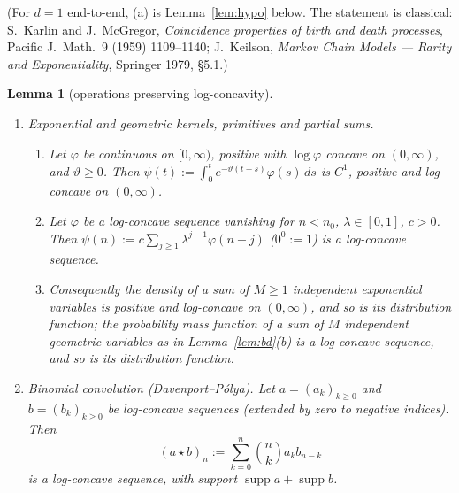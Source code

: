 \documentclass[11pt,a4paper]{article}
\newtheorem{lemma}[theorem]{Lemma}
\theoremstyle{definition}
\begin{document}
(For $d=1$ end-to-end, (a) is Lemma~\ref{lem:hypo} below. The statement is classical: S.~Karlin and J.~McGregor, \emph{Coincidence properties of birth and death processes}, Pacific J.\ Math.\ 9 (1959) 1109--1140; J.~Keilson, \emph{Markov Chain Models --- Rarity and Exponentiality}, Springer 1979, \S5.1.)

\begin{lemma}[operations preserving log-concavity]\label{lem:lcops}
\begin{enumerate}
\item[(a)] \emph{Exponential and geometric kernels, primitives and partial sums.}
\begin{enumerate}
\item[(i)] Let $\varphi$ be continuous on $[0,\infty)$, positive with $\log\varphi$ concave on $(0,\infty)$, and $\vartheta\ge0$. Then $\psi(t):=\int_0^te^{-\vartheta(t-s)}\varphi(s)\,ds$ is $C^1$, positive and log-concave on $(0,\infty)$.
\item[(ii)] Let $\varphi$ be a log-concave sequence vanishing for $n<n_0$, $\lambda\in[0,1]$, $c>0$. Then $\psi(n):=c\sum_{j\ge1}\lambda^{j-1}\varphi(n-j)$ ($0^0:=1$) is a log-concave sequence.
\item[(iii)] Consequently the density of a sum of $M\ge1$ independent exponential variables is positive and log-concave on $(0,\infty)$, and so is its distribution function; the probability mass function of a sum of $M$ independent geometric variables as in Lemma~\ref{lem:bd}(b) is a log-concave sequence, and so is its distribution function.
\end{enumerate}
\item[(b)] \emph{Binomial convolution (Davenport--P\'olya).} Let $a=(a_k)_{k\ge0}$ and $b=(b_k)_{k\ge0}$ be log-concave sequences (extended by zero to negative indices). Then
\[
(a\star b)_n:=\sum_{k=0}^n\binom nka_kb_{n-k}
\]
is a log-concave sequence, with support $\operatorname{supp}a+\operatorname{supp}b$.
\end{enumerate}
\end{lemma}
\end{document}
